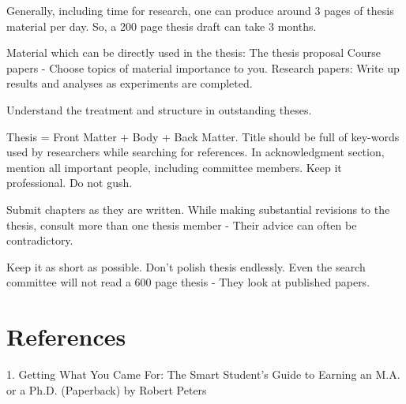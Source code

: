 \documentclass[oneside, article]{memoir}
\begin{document}
\subitem Generally, including time for research, one can produce around 3 pages of thesis material per day. So, a 200 page thesis draft can take 3 months.

\subitem Material which can be directly used in the thesis:
\subsubitem The thesis proposal
\subsubitem Course papers - Choose topics of material importance to you.
\subsubitem Research papers: Write up results and analyses as experiments are completed.

\subitem Understand the treatment and structure in outstanding theses.

\subitem Thesis = Front Matter + Body + Back Matter.
\subsubitem Title should be full of key-words used by researchers while searching for references.
\subsubitem In acknowledgment section, mention all important people, including committee members. Keep it professional. Do not gush.

\subitem Submit chapters as they are written.
\subsubitem While making substantial revisions to the thesis, consult more than one thesis member - Their advice can often be contradictory.

\subitem Keep it as short as possible. Don't polish thesis endlessly. Even the search committee will not read a 600 page thesis - They look at published papers.

\section{References}
   1. Getting What You Came For: The Smart Student's Guide to Earning an M.A. or a Ph.D. (Paperback) by Robert Peters
\end{document}
